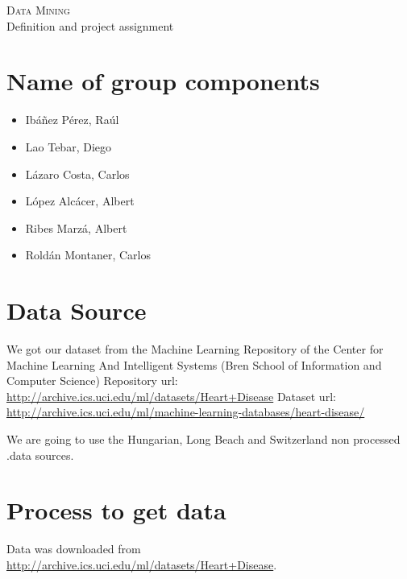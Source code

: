 \documentclass[a4paper,12pt]{article}
\begin{document}
\begin{center}
    \huge{\textsc{Data Mining} \\ Definition and project assignment}
\end{center}


%

\section{Name of group components}

    \begin{itemize}

        \item Ibáñez Pérez, Raúl
        \item Lao Tebar, Diego
        \item Lázaro Costa, Carlos
        \item López Alcácer, Albert
        \item Ribes Marzá, Albert
        \item Roldán Montaner, Carlos

    \end{itemize}

\section{Data Source}

    We got our dataset from the Machine Learning Repository of the Center for Machine Learning And Intelligent Systems (Bren School of Information and Computer Science)\newline
    Repository url: \url{http://archive.ics.uci.edu/ml/datasets/Heart+Disease}\newline
    Dataset url: \url{http://archive.ics.uci.edu/ml/machine-learning-databases/heart-disease/} \newline

    We are going to use the Hungarian, Long Beach and Switzerland non processed .data sources.

\section{Process to get data}
    Data was downloaded from \url{http://archive.ics.uci.edu/ml/datasets/Heart+Disease}.
\end{document}

